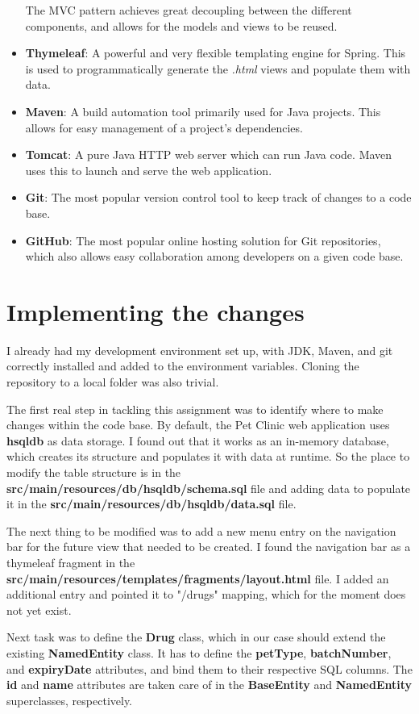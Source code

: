 \documentclass[12pt, a4paper]{article}
\begin{document}
\begin{itemize}
The MVC pattern achieves great decoupling between the different components, and allows for the models and views to be reused.
\item \textbf{Thymeleaf}: A powerful and very flexible templating engine for Spring. This is used to programmatically generate the \textit{.html} views and populate them with data.
\item \textbf{Maven}: A build automation tool primarily used for Java projects. This allows for easy management of a project's dependencies.
\item \textbf{Tomcat}: A pure Java HTTP web server which can run Java code. Maven uses this to launch and serve the web application.
\item \textbf{Git}: The most popular version control tool to keep track of changes to a code base.
\item \textbf{GitHub}: The most popular online hosting solution for Git repositories, which also allows easy collaboration among developers on a given code base.
\end{itemize}

\newpage
\section{Implementing the changes}
I already had my development environment set up, with JDK, Maven, and git correctly installed and added to the environment variables. Cloning the repository to a local folder was also trivial.

The first real step in tackling this assignment was to identify where to make changes within the code base. By default, the Pet Clinic web application uses \textbf{hsqldb} as data storage. I found out that it works as an in-memory database, which creates its structure and populates it with data at runtime. So the place to modify the table structure is in the \textbf{src/main/resources/db/hsqldb/schema.sql} file and adding data to populate it in the \textbf{src/main/resources/db/hsqldb/data.sql} file.

The next thing to be modified was to add a new menu entry on the navigation bar for the future view that needed to be created. I found the navigation bar as a thymeleaf fragment in the \textbf{src/main/resources/templates/fragments/layout.html} file. I added an additional entry and pointed it to "/drugs" mapping, which for the moment does not yet exist.

Next task was to define the \textbf{Drug} class, which in our case should extend the existing \textbf{NamedEntity} class. It has to define the \textbf{petType}, \textbf{batchNumber}, and \textbf{expiryDate} attributes, and bind them to their respective SQL columns. The \textbf{id} and \textbf{name} attributes are taken care of in the \textbf{BaseEntity} and \textbf{NamedEntity} superclasses, respectively.
\end{document}
